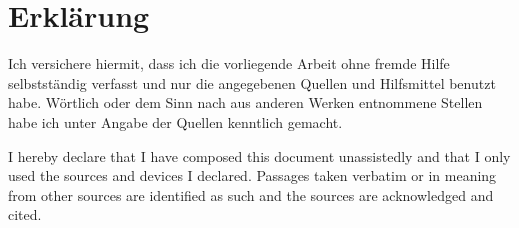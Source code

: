 \section*{Erklärung}

Ich versichere hiermit, dass ich die vorliegende Arbeit ohne fremde Hilfe selbstständig verfasst und nur die angegebenen Quellen und Hilfsmittel benutzt habe. Wörtlich oder dem Sinn nach aus anderen Werken entnommene Stellen habe ich unter Angabe der Quellen kenntlich gemacht.

\medskip

I hereby declare that I have composed this document unassistedly and that I only used the sources and devices I declared. Passages taken verbatim or in meaning from other sources are identified as such and the sources are acknowledged and cited.

\vspace{2cm}

\noindent \year